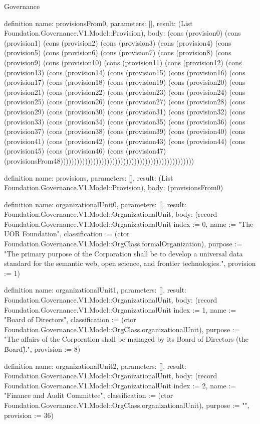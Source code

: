 \begin{lexlean}{Governance}
\begin{semanticmodule}
definition{
  name: provisionsFrom0,
  parameters: [],
  result: (List Foundation.Governance.V1.Model::Provision),
  body: (cons (provision0) (cons (provision1) (cons (provision2) (cons (provision3) (cons (provision4) (cons (provision5) (cons (provision6) (cons (provision7) (cons (provision8) (cons (provision9) (cons (provision10) (cons (provision11) (cons (provision12) (cons (provision13) (cons (provision14) (cons (provision15) (cons (provision16) (cons (provision17) (cons (provision18) (cons (provision19) (cons (provision20) (cons (provision21) (cons (provision22) (cons (provision23) (cons (provision24) (cons (provision25) (cons (provision26) (cons (provision27) (cons (provision28) (cons (provision29) (cons (provision30) (cons (provision31) (cons (provision32) (cons (provision33) (cons (provision34) (cons (provision35) (cons (provision36) (cons (provision37) (cons (provision38) (cons (provision39) (cons (provision40) (cons (provision41) (cons (provision42) (cons (provision43) (cons (provision44) (cons (provision45) (cons (provision46) (cons (provision47) (provisionsFrom48)))))))))))))))))))))))))))))))))))))))))))))))))
}

definition{
  name: provisions,
  parameters: [],
  result: (List Foundation.Governance.V1.Model::Provision),
  body: (provisionsFrom0)
}

definition{
  name: organizationalUnit0,
  parameters: [],
  result: Foundation.Governance.V1.Model::OrganizationalUnit,
  body: (record Foundation.Governance.V1.Model::OrganizationalUnit {index := 0, name := "The UOR Foundation", classification := (ctor Foundation.Governance.V1.Model::OrgClass.formalOrganization), purpose := "The primary purpose of the Corporation shall be to develop a universal data standard for the semantic web, open science, and frontier technologies.", provision := 1})
}

definition{
  name: organizationalUnit1,
  parameters: [],
  result: Foundation.Governance.V1.Model::OrganizationalUnit,
  body: (record Foundation.Governance.V1.Model::OrganizationalUnit {index := 1, name := "Board of Directors", classification := (ctor Foundation.Governance.V1.Model::OrgClass.organizationalUnit), purpose := "The affairs of the Corporation shall be managed by its Board of Directors (the \"Board\").", provision := 8})
}

definition{
  name: organizationalUnit2,
  parameters: [],
  result: Foundation.Governance.V1.Model::OrganizationalUnit,
  body: (record Foundation.Governance.V1.Model::OrganizationalUnit {index := 2, name := "Finance and Audit Committee", classification := (ctor Foundation.Governance.V1.Model::OrgClass.organizationalUnit), purpose := "", provision := 36})
}


\end{semanticmodule}
\end{lexlean}
